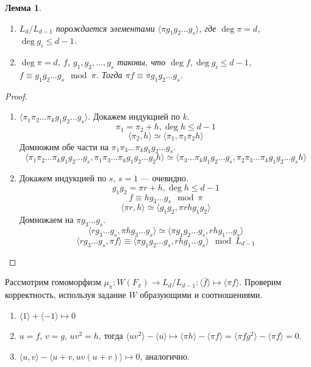 \documentclass{article}
\newtheorem*{lemma}{Лемма}
\theoremstyle{definition}
\theoremstyle{remark}
\begin{document}
\begin{lemma} \quad
    \begin{enumerate}[nosep, wide, label = \arabic*)]
        \item $L_d / L_{d - 1}$  порождается элементами $\langle \pi g_1 g_2 \ldots g_s \rangle$, где $\deg \pi = d$, $\deg g_i \leq d - 1$.
        \item $\deg \pi = d$, $f$, $g_1, g_2, \ldots, g_s$ таковы, что $\deg f, \deg g_i \leq d - 1$, $f \equiv g_1 g_2 \ldots g_s \mod \pi$. Тогда $\pi f \equiv \pi g_1 g_2 \ldots g_s$.
    \end{enumerate}
\end{lemma}
\begin{proof}
    \begin{enumerate}[nosep, wide, label = \arabic*)]
        \item $\langle \pi_1 \pi_2 \ldots \pi_k g_1 g_2 \ldots g_s \rangle$. Докажем индукцией по $k$.
        $$\pi_1 = \pi_2 + h, \deg h \leq d - 1$$
        $$\langle \pi_2, h \rangle \simeq \langle \pi_1, \pi_1 \pi_2 h \rangle$$
        Домножим обе части на $\pi_1 \pi_3 \ldots \pi_k g_1 g_2 \ldots g_s$.
        $$\langle \pi_1 \pi_2 \ldots \pi_k g_1 g_2 \ldots g_s, \pi_1 \pi_3 \ldots \pi_k g_1 g_2 \ldots g_2h \rangle \simeq \langle \pi_3 \ldots \pi_k g_1 g_2 \ldots g_s, \pi_2 \pi_3 \ldots \pi_k g_1 g_2 \ldots g_s h \rangle$$
        \item Докажем индукцией по $s$, $s = 1$ --- очевидно.
        $$g_1 g_2 = \pi r + h, \deg h \leq d - 1$$
        $$f \equiv h g_3 \ldots g_s \mod \pi$$
        $$\langle \pi r, h \rangle \simeq \langle g_1 g_2, \pi r h g_1 g_2 \rangle$$
        Домножаем на $\pi g_3 \ldots g_s$.
        $$\langle r g_3 \ldots g_s, \pi h g_3 \ldots g_s \rangle \simeq \langle \pi g_1 g_2 \ldots g_s, rh g_1 \ldots g_s \rangle$$
        $$\langle r g_3 \ldots g_s, \pi f \rangle \equiv \langle \pi g_1 g_2 \ldots g_s, rh g_1 \ldots g_s \rangle \mod L_{d - 1}$$
    \end{enumerate}
\end{proof}

Рассмотрим гомоморфизм $\mu_\pi: W(F_\pi) \rightarrow L_d/L_{d - 1}: \langle \bar{f} \rangle \mapsto \langle \pi f \rangle$. Проверим корректность, используя задание $W$ образующими и соотношениями.

\begin{enumerate}[nosep, wide, label = \arabic*)]
    \item $\langle 1 \rangle + \langle -1 \rangle \mapsto 0$
    \item $u = f$, $v = g$, $uv^2 = h$, тогда $\langle u v^2 \rangle - \langle u \rangle \mapsto \langle \pi h \rangle - \langle \pi f \rangle = \langle \pi f g^2 \rangle - \langle \pi f \rangle = 0$.
    \item $\langle u, v \rangle - \langle u + v, uv(u + v) \rangle \mapsto 0$, аналогично.
\end{enumerate}
\end{document}
